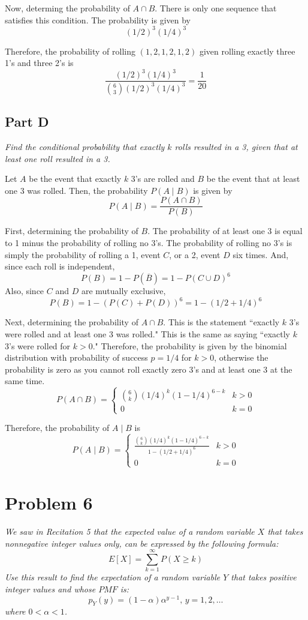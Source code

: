 \documentclass{article}
\begin{document}
Now, determing the probability of $ A \cap B $. There is only one sequence
that satisfies this condition. The probability is given by
$$ (1/2)^3 (1/4)^3 $$

Therefore, the probability of rolling $ (1, 2, 1, 2, 1, 2) $ given rolling
exactly three 1's and three 2's is
$$ \frac{ (1/2)^3 (1/4)^3 }{\binom{6}{3} (1/2)^3 (1/4)^3} = \frac{1}{20} $$

\subsection*{Part D}

\textit{Find the conditional probability that exactly $ k $ rolls resulted in
a 3, given that at least one roll resulted in a 3.}

\bigbreak

Let $ A $ be the event that exactly $ k $ 3's are rolled and $ B $ be the
event that at least one 3 was rolled. Then, the probability $ P(A \mid B) $
is given by
$$ P(A \mid B) = \frac{P(A \cap B)}{P(B)} $$

First, determining the probability of $ B $. The probability of at least one
3 is equal to 1 minus the probability of rolling no 3's. The probability of
rolling no 3's is simply the probability of rolling a 1, event $C$, or a 2,
event $D$ six times. And, since each roll is independent,
$$ P(B) = 1 - P(\overline{B}) = 1 - P(C \cup D)^6 $$
Also, since $ C $ and $ D $ are mutually exclusive,
$$ P(B) = 1 - (P(C) + P(D))^6 = 1 - (1/2 + 1/4)^6 $$

Next, determining the probability of $ A \cap B $. This is the statement
``exactly $k$ 3's were rolled and at least one 3 was rolled." This is the same
as saying ``exactly $k$ 3's were rolled for $ k > 0 $." Therefore, the probability
is given by the binomial distribution with probability of success $ p = 1/4 $
for $ k > 0 $, otherwise the probability is zero as you cannot roll exactly
zero 3's and at least one 3 at the same time.
$$ P(A \cap B) = \begin{cases}
    \binom{6}{k} (1/4)^k (1 - 1/4)^{6 - k} & k > 0 \\
    0 & k = 0
\end{cases} $$

Therefore, the probability of $ A \mid B $ is
$$ P(A \mid B) = \begin{cases}
    \frac{\binom{6}{k} (1/4)^k (1 - 1/4)^{6 - k}}{1 - (1/2 + 1/4)^6} & k > 0 \\
    0 & k = 0
\end{cases} $$

\section*{Problem 6}

\textit{We saw in Recitation 5 that the expected value of a random variable $
X $ that takes nonnegative integer values only, can be expressed by the
following formula:}
$$ E [X] = \sum\limits_{k=1}^{\infty} P(X \geq k) $$
\textit{Use this result to find the expectation of a random variable $ Y $
that takes positive integer values and whose $ PMF $ is:}
$$ p_Y(y) = (1 - \alpha) \alpha^{y - 1},\, y = 1, 2, \ldots $$
\textit{where $ 0 < \alpha < 1 $.}
\end{document}
